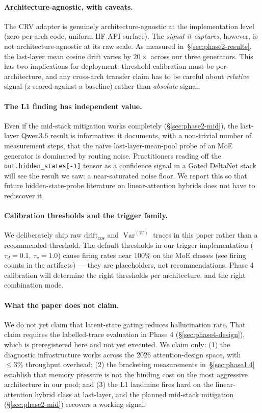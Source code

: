 \documentclass[11pt,letterpaper]{article}
\newcommand{\drift}{\mathrm{drift}_{\cos}}
\newcommand{\Var}{\operatorname{Var}}
\begin{document}
\paragraph{Architecture-agnostic, with caveats.}
The CRV adapter is genuinely architecture-agnostic at the
implementation level (zero per-arch code, uniform HF API surface). The
\emph{signal it captures}, however, is not architecture-agnostic at
its raw scale. As measured in~\S\ref{sec:phase2-results}, the
last-layer mean cosine drift varies by $20\times$ across our three
generators. This has two implications for deployment:
threshold calibration must be per-architecture, and any cross-arch
transfer claim has to be careful about \emph{relative} signal
(z-scored against a baseline) rather than \emph{absolute} signal.

\paragraph{The L1 finding has independent value.}
Even if the mid-stack mitigation works completely
(\S\ref{sec:phase2-mid}), the last-layer Qwen3.6 result is informative:
it documents, with a non-trivial number of measurement steps, that the
naive last-layer-mean-pool probe of an MoE generator is dominated by
routing noise. Practitioners reading off the
\verb|out.hidden_states[-1]| tensor as a confidence signal in a Gated
DeltaNet stack will see the result we saw: a near-saturated noise
floor. We report this so that future hidden-state-probe literature on
linear-attention hybrids does not have to rediscover it.

\paragraph{Calibration thresholds and the trigger family.}
We deliberately ship raw $\drift$ and $\Var^{(W)}$ traces in
this paper rather than a recommended threshold. The default thresholds
in our trigger implementation ($\tau_d = 0.1$, $\tau_v = 1.0$) cause
firing rates near $100\%$ on the MoE classes
(see firing counts in the artifacts) — they are placeholders, not
recommendations. Phase 4 calibration will determine the right
thresholds per architecture, and the right combination mode.

\paragraph{What the paper does not claim.}
We do not yet claim that latent-state gating reduces hallucination
rate. That claim requires the labelled-trace evaluation in
Phase 4 (\S\ref{sec:phase4-design}), which is preregistered here and
not yet executed. We claim only:
(1) the diagnostic infrastructure works across the 2026
attention-design space, with $\le 3\%$ throughput overhead;
(2) the bracketing measurements in~\S\ref{sec:phase1.4} establish that
memory pressure is not the binding cost on the most aggressive
architecture in our pool; and
(3) the L1 landmine fires hard on the linear-attention hybrid class at
last-layer, and the planned mid-stack mitigation
(\S\ref{sec:phase2-mid}) recovers a working signal.
\end{document}
